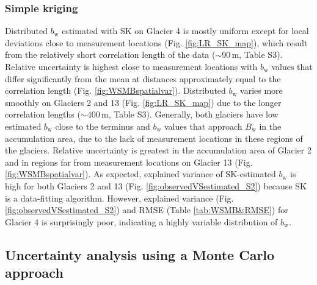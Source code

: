 \documentclass[twocolumn, letterpaper]{igs}
\begin{document}
\subsubsection{Simple kriging}

Distributed $b_\mathrm{w}$ estimated with SK on Glacier 4 is mostly uniform except for local deviations close to measurement locations (Fig. \ref{fig:LR_SK_map}), which result from the relatively short correlation length of the data ($\sim$90\,m, Table S3). Relative uncertainty is highest close to measurement locations with $b_\mathrm{w}$ values that differ significantly from the mean at distances approximately equal to the correlation length (Fig. \ref{fig:WSMBspatialvar}).
Distributed $b_\mathrm{w}$ varies more smoothly on Glaciers 2 and 13 (Fig. \ref{fig:LR_SK_map}) due to the longer correlation lengths ($\sim$400\,m, Table S3). Generally, both glaciers have low estimated $b_\mathrm{w}$ close to the terminus and $b_\mathrm{w}$ values that approach $B_\mathrm{w}$ in the accumulation area, due to the lack of measurement locations in these regions of the glaciers. Relative uncertainty is greatest in the accumulation area of Glacier 2 and in regions far from measurement locations on Glacier 13 (Fig. \ref{fig:WSMBspatialvar}). 
As expected, explained variance of SK-estimated $b_\mathrm{w}$ is high for both Glaciers 2 and 13 (Fig. \ref{fig:observedVSestimated_S2}) because SK is a data-fitting algorithm. However, explained variance (Fig. \ref{fig:observedVSestimated_S2}) and RMSE (Table \ref{tab:WSMB&RMSE}) for Glacier 4 is surprisingly poor, indicating a highly variable distribution of $b_\mathrm{w}$.


\subsection{Uncertainty analysis using a Monte Carlo approach}
\end{document}
